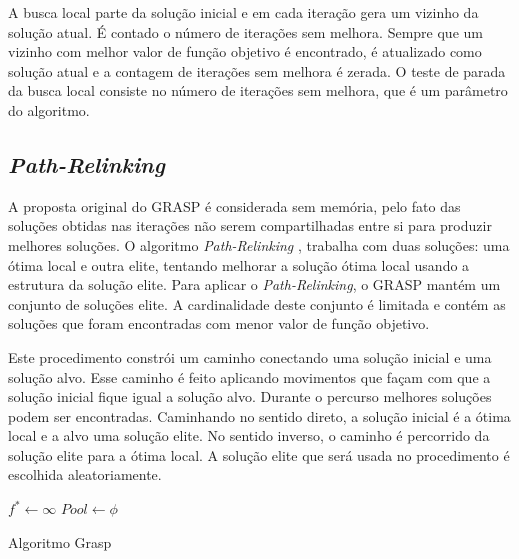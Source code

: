 \documentclass[11pt]{article}
\begin{document}
A busca local parte da solução inicial e em cada iteração gera um vizinho da solução atual. É contado o número de iterações sem melhora. Sempre que um vizinho com melhor valor de função objetivo é encontrado, é atualizado como solução atual e a contagem de iterações sem melhora é zerada. O teste de parada da busca local consiste no número de iterações sem melhora, que é um parâmetro do algoritmo. 

\subsection{\textit{Path-Relinking}}

A proposta original do GRASP é considerada sem memória, pelo fato das soluções obtidas nas iterações não serem compartilhadas entre si para produzir melhores soluções. O algoritmo \textit{Path-Relinking} \cite{Glover96tabusearch}, \cite{pathRelinking} trabalha com duas soluções: uma ótima local e outra elite, tentando melhorar a solução ótima local usando a estrutura da solução elite. Para aplicar o \textit{Path-Relinking}, o GRASP mantém um conjunto de soluções elite. A cardinalidade deste conjunto é limitada e contém as soluções que foram encontradas com menor valor de função objetivo.

Este procedimento constrói um caminho conectando uma solução inicial e uma solução alvo. Esse caminho é feito aplicando movimentos que façam com que a solução inicial fique igual a solução alvo. Durante o percurso melhores soluções podem ser encontradas. Caminhando no sentido direto, a solução inicial é a ótima local e a alvo uma solução elite. No sentido inverso, o caminho é percorrido da solução elite para a ótima local. A solução elite que será usada no procedimento é escolhida aleatoriamente.

\begin{algorithm}[H]
\SetAlgoLined
{}

$f^{*} \leftarrow \infty $ \;
$Pool \leftarrow \phi $ \;
\caption{Algoritmo Grasp}
\end{algorithm}
\end{document}
